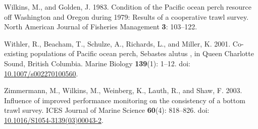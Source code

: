 \documentclass[12pt,]{article}
\begin{document}
\hypertarget{ref-wilkins_condition_1983}{}
Wilkins, M., and Golden, J. 1983. Condition of the Pacific ocean perch
resource off Washington and Oregon during 1979: Results of a cooperative
trawl survey. North American Journal of Fisheries Management \textbf{3}:
103--122.

\hypertarget{ref-withler_co-existing_2001}{}
Withler, R., Beacham, T., Schulze, A., Richards, L., and Miller, K.
2001. Co-existing populations of Pacific ocean perch, Sebastes alutus ,
in Queen Charlotte Sound, British Columbia. Marine Biology
\textbf{139}(1): 1--12. doi:
\href{https://doi.org/10.1007/s002270100560}{10.1007/s002270100560}.

\hypertarget{ref-zimmermann_influence_2003}{}
Zimmermann, M., Wilkins, M., Weinberg, K., Lauth, R., and Shaw, F. 2003.
Influence of improved performance monitoring on the consistency of a
bottom trawl survey. ICES Journal of Marine Science \textbf{60}(4):
818--826. doi:
\href{https://doi.org/10.1016/S1054-3139(03)00043-2}{10.1016/S1054-3139(03)00043-2}.
\end{document}
